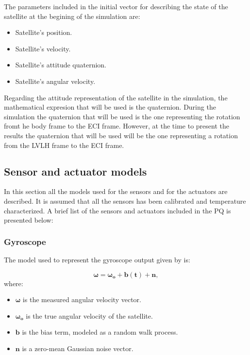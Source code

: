 \noindent The parameters included in the initial vector for describing the state of the satellite at the begining of the simulation are:

\begin{itemize}
    \item Satellite's position.
    \item Satellite's velocity.
    \item Satellite's attitude quaternion.
    \item Satellite's angular velocity.
\end{itemize}

\noindent Regarding the attitude representation of the satellite in the simulation, the mathematical expresion that will be used is the quaternion. During the
simulation the quaternion that will be used is the one representing the rotation fromt he body frame to the ECI frame. However, at the time to 
present the results the quaternion that will be used will be the one representing a rotation from the LVLH frame to the ECI frame.

\subsection{Sensor and actuator models}
In this section all the models used for the sensors and for the actuators are described. It is assumed that all the sensors has been calibrated
and temperature characterized. A brief list of the sensors and actuators included in the PQ is presented below:

\sensorsactuators

\subsubsection{Gyroscope}
The model used to represent the gyroscope output given by \cite{Landis} is:

\begin{equation}
    \boldsymbol{\omega} = \boldsymbol{\omega_o} +\boldsymbol{b(t)}+\boldsymbol{n},
\end{equation}
where:
\begin{itemize}
    \item $\boldsymbol{\omega}$ is the measured angular velocity vector.
    \item $\boldsymbol{\omega_o}$ is the true angular velocity of the satellite.
    \item $\boldsymbol{b}$ is the bias term, modeled as a random walk process.
    \item $\boldsymbol{n}$ is a zero-mean Gaussian noise vector.
\end{itemize}

